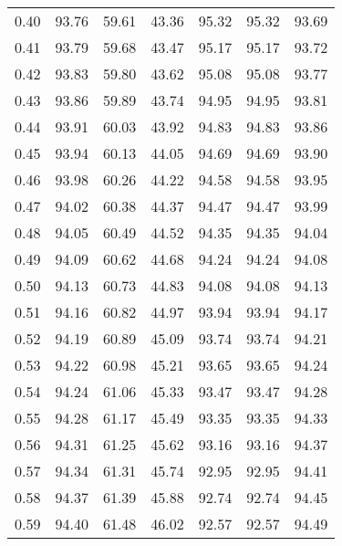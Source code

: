 \begin{tabular}{|c|c|c|c|c|c|c|}
      0.40 &     93.76 &     59.61 &      43.36 &   95.32 &      95.32 &         93.69 \\
      0.41 &     93.79 &     59.68 &      43.47 &   95.17 &      95.17 &         93.72 \\
      0.42 &     93.83 &     59.80 &      43.62 &   95.08 &      95.08 &         93.77 \\
      0.43 &     93.86 &     59.89 &      43.74 &   94.95 &      94.95 &         93.81 \\
      0.44 &     93.91 &     60.03 &      43.92 &   94.83 &      94.83 &         93.86 \\
      0.45 &     93.94 &     60.13 &      44.05 &   94.69 &      94.69 &         93.90 \\
      0.46 &     93.98 &     60.26 &      44.22 &   94.58 &      94.58 &         93.95 \\
      0.47 &     94.02 &     60.38 &      44.37 &   94.47 &      94.47 &         93.99 \\
      0.48 &     94.05 &     60.49 &      44.52 &   94.35 &      94.35 &         94.04 \\
      0.49 &     94.09 &     60.62 &      44.68 &   94.24 &      94.24 &         94.08 \\
      0.50 &     94.13 &     60.73 &      44.83 &   94.08 &      94.08 &         94.13 \\
      0.51 &     94.16 &     60.82 &      44.97 &   93.94 &      93.94 &         94.17 \\
      0.52 &     94.19 &     60.89 &      45.09 &   93.74 &      93.74 &         94.21 \\
      0.53 &     94.22 &     60.98 &      45.21 &   93.65 &      93.65 &         94.24 \\
      0.54 &     94.24 &     61.06 &      45.33 &   93.47 &      93.47 &         94.28 \\
      0.55 &     94.28 &     61.17 &      45.49 &   93.35 &      93.35 &         94.33 \\
      0.56 &     94.31 &     61.25 &      45.62 &   93.16 &      93.16 &         94.37 \\
      0.57 &     94.34 &     61.31 &      45.74 &   92.95 &      92.95 &         94.41 \\
      0.58 &     94.37 &     61.39 &      45.88 &   92.74 &      92.74 &         94.45 \\
      0.59 &     94.40 &     61.48 &      46.02 &   92.57 &      92.57 &         94.49 \\

\end{tabular}
